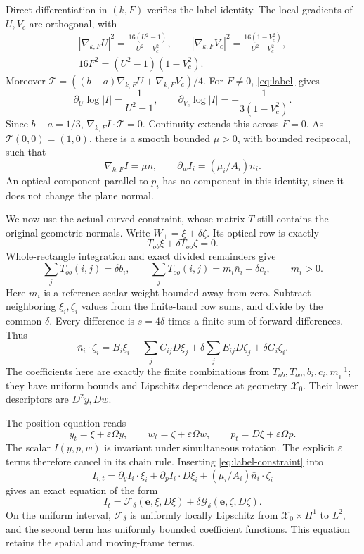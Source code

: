 \documentclass[11pt,a4paper]{article}
\numberwithin{equation}{section}
\theoremstyle{remark}
\newcommand{\Xzero}{\mathcal X_0}
\begin{document}
Direct differentiation in \((k,F)\) verifies the label identity.
The local gradients of \(U,V_c\) are orthogonal, with
\[
 \begin{gathered}
 |\nabla_{k,F} U|^2=\frac{16(U^2-1)}{U^2-V_c^2},\qquad
 |\nabla_{k,F} V_c|^2=\frac{16(1-V_c^2)}{U^2-V_c^2},\\
 16F^2=(U^2-1)(1-V_c^2).
 \end{gathered}
\]
Moreover
\(\mathcal T=((b-a)\nabla_{k,F}U+\nabla_{k,F}V_c)/4\).
For \(F\ne0\), \eqref{eq:label} gives
\[
 \partial_U\log|I|=\frac1{U^2-1},\qquad
 \partial_{V_c}\log|I|=-\frac1{3(1-V_c^2)}.
\]
Since \(b-a=1/3\), \(\nabla_{k,F} I\cdot\mathcal T=0\).
Continuity extends this across \(F=0\). As
\(\mathcal T(0,0)=(1,0)\), there is a smooth bounded
\(\mu>0\), with bounded reciprocal, such that
\begin{equation}\label{eq:label-normal}
             \nabla_{k,F}I=\mu\bar n,\qquad
             \partial_w I_i=(\mu_i/A_i)\bar n_i .
\end{equation}
An optical component parallel to \(p_i\) has no component in this
identity, since it does not change the plane normal.

We now use the actual curved constraint, whose matrix \(T\) still
contains the original geometric normals. Write
\(W_\pm=\xi\pm\delta\zeta\). Its optical row is exactly
\[
                       T_{ob}\xi+\delta T_{oo}\zeta=0 .
\]
Whole-rectangle integration and exact divided remainders give
\[
 \sum_jT_{ob}(i,j)=\delta b_i,\qquad
 \sum_jT_{oo}(i,j)=m_i\bar n_i+\delta c_i,\qquad m_i>0 .
\]
Here \(m_i\) is a reference scalar weight bounded away from zero.
Subtract neighboring \(\xi_i,\zeta_i\) values from the finite-band
row sums, and divide by the common \(\delta\). Every difference
is \(s=4\delta\) times a finite sum of forward differences. Thus
\begin{equation}\label{eq:label-constraint}
 \bar n_i\cdot\zeta_i
  =B_i\xi_i+\sum_jC_{ij}D\xi_j
       +\delta\sum_jE_{ij}D\zeta_j+\delta G_i\zeta_i .
\end{equation}
The coefficients here are exactly the finite combinations from
\(T_{ob},T_{oo},b_i,c_i,m_i^{-1}\); they have uniform bounds and
Lipschitz dependence at geometry \(\Xzero\).
Their lower descriptors are \(D^2y,Dw\).

The position equation reads
\[
 y_t=\xi+\varepsilon\Omega y,\qquad
 w_t=\zeta+\varepsilon\Omega w,\qquad
 p_t=D\xi+\varepsilon\Omega p.
\]
The scalar \(I(y,p,w)\) is invariant under simultaneous rotation.
The explicit \(\varepsilon\) terms therefore cancel in its chain
rule. Inserting \eqref{eq:label-constraint} into
\[
 I_{i,t}=\partial_yI_i\cdot\xi_i+
        \partial_pI_i\cdot D\xi_i+
                       (\mu_i/A_i)\bar n_i\cdot\zeta_i
\]
gives an exact equation of the form
\begin{equation}\label{eq:label-spatial}
 I_t=\mathcal F_\delta(\mathbf e,\xi,D\xi)
                  +\delta\mathcal G_\delta(\mathbf e,\zeta,D\zeta).
\end{equation}
On the uniform interval, \(\mathcal F_\delta\) is uniformly locally
Lipschitz from \(\Xzero\times H^1\) to \(L^2\), and the second
term has uniformly bounded coefficient functions. This equation
retains the spatial and moving-frame terms.
\end{document}
